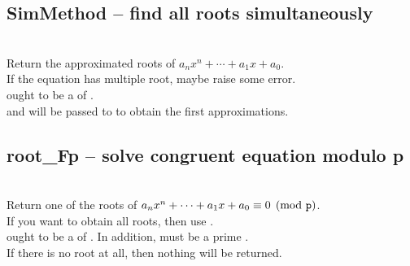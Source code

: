   \subsection{SimMethod -- find all roots simultaneously}
   \\
   \spacing
   \quad Return the approximated roots of $a_nx^n + \cdots + a_1x + a_0$.\\
   \spacing
   \quad \negok If the equation has multiple root, maybe raise some error. \\
   \spacing
   \quad {} ought to be a  of
   .\\
    and  will be passed to 
    to obtain the first approximations.\\
%
  \subsection{root\_Fp --  solve congruent equation modulo p}
   \\
   \spacing
   \quad Return one of the roots of $a_nx^n + \cdots + a_1x + a_0 \equiv 0 \pmod{{\texttt p}}$. \\
   \spacing
   \quad If you want to obtain all roots, then use .\\
   \spacing
   \quad {} ought to be a  of
   .
   In addition,  must be a prime . \\
   \quad If there is no root at all, then nothing will be returned.\\
%
